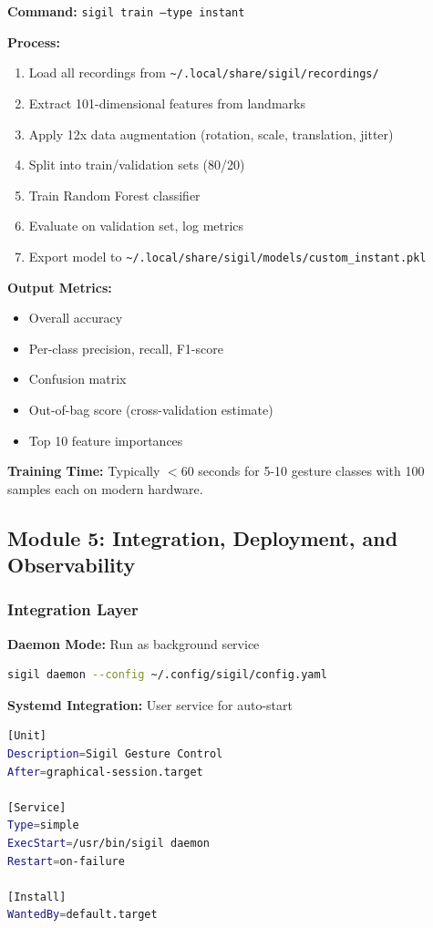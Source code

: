 \documentclass[11pt,a4paper]{article}
\begin{document}
\textbf{Command:} \texttt{sigil train --type instant}

\textbf{Process:}
\begin{enumerate}
\item Load all recordings from \texttt{\textasciitilde/.local/share/sigil/recordings/}
\item Extract 101-dimensional features from landmarks
\item Apply 12x data augmentation (rotation, scale, translation, jitter)
\item Split into train/validation sets (80/20)
\item Train Random Forest classifier
\item Evaluate on validation set, log metrics
\item Export model to \texttt{\textasciitilde/.local/share/sigil/models/custom\_instant.pkl}
\end{enumerate}

\textbf{Output Metrics:}
\begin{itemize}
\item Overall accuracy
\item Per-class precision, recall, F1-score
\item Confusion matrix
\item Out-of-bag score (cross-validation estimate)
\item Top 10 feature importances
\end{itemize}

\textbf{Training Time:} Typically $<$60 seconds for 5-10 gesture classes with 100 samples each on modern hardware.

\subsection{Module 5: Integration, Deployment, and Observability}

\subsubsection{Integration Layer}

\textbf{Daemon Mode:} Run as background service
\begin{lstlisting}[language=bash]
sigil daemon --config ~/.config/sigil/config.yaml
\end{lstlisting}

\textbf{Systemd Integration:} User service for auto-start
\begin{lstlisting}[language=bash]
[Unit]
Description=Sigil Gesture Control
After=graphical-session.target

[Service]
Type=simple
ExecStart=/usr/bin/sigil daemon
Restart=on-failure

[Install]
WantedBy=default.target
\end{lstlisting}
\end{document}
